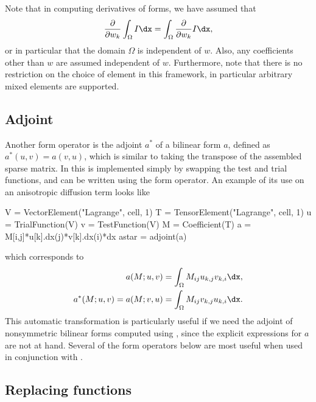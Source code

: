 Note that in computing derivatives of forms, we have assumed that
\begin{align}
\frac{\partial}{\partial w_k} \int_\Omega I \dx
= \int_\Omega \frac{\partial}{\partial w_k} I \dx,
\end{align}
or in particular that the domain $\Omega$ is independent of $w$.
Also, any coefficients other than $w$ are assumed independent of $w$.
Furthermore, note that there is no restriction on the choice of element
in this framework, in particular arbitrary mixed elements are supported.

\subsection{Adjoint}
\label{ufl:sec:adjoint}

Another form operator is the adjoint $a^*$ of a bilinear form $a$,
defined as $a^*(u,v) = a(v,u)$, which is similar to taking the transpose
of the assembled sparse matrix.  In \ufl{} this is implemented simply
by swapping the test and trial functions, and can be written using the
 form operator.  An example of its use on an anisotropic
diffusion term looks like
\begin{uflcode}
V = VectorElement("Lagrange", cell, 1)
T = TensorElement("Lagrange", cell, 1)
u = TrialFunction(V)
v = TestFunction(V)
M = Coefficient(T)
a = M[i,j]*u[k].dx(j)*v[k].dx(i)*dx
astar = adjoint(a)
\end{uflcode}
which corresponds to
\begin{align}
a(M; u, v) = \int_\Omega M_{ij} u_{k,j} v_{k,i} \dx, \\
a^*(M; u, v) = a(M; v, u) = \int_\Omega  M_{ij} v_{k,j} u_{k,i} \dx.
\end{align}
This automatic transformation is particularly useful if we need the
adjoint of nonsymmetric bilinear forms computed using
, since the explicit expressions for $a$ are not at
hand.  Several of the form operators below are most useful when used
in conjunction with .

\subsection{Replacing functions}
\label{ufl:sec:replace}

